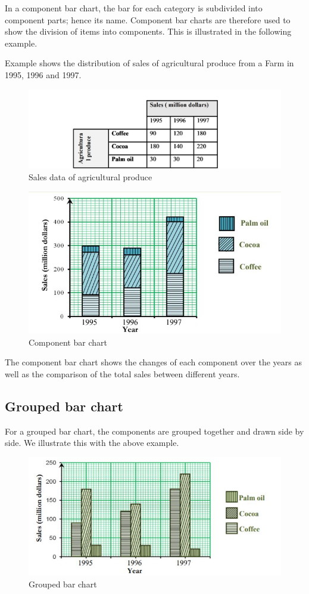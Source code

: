 \documentclass[
]{book}
\begin{document}
In a component bar chart, the bar for each category is subdivided into component parts; hence its name. Component bar charts are therefore used to show the division of items into components. This is illustrated in the following example.

Example shows the distribution of sales of agricultural produce from a Farm in 1995, 1996 and 1997.

\begin{figure}

{\centering \includegraphics[width=0.5\linewidth]{images/image14} 

}

\caption{Sales data of agricultural produce}\label{fig:componentdata}
\end{figure}

\begin{figure}

{\centering \includegraphics[width=0.5\linewidth]{images/image15} 

}

\caption{Component bar chart}\label{fig:componentbar}
\end{figure}

The component bar chart shows the changes of each component over the years as well as the comparison of the total sales between different years.

\hypertarget{grouped-bar-chart}{%
\subsection{Grouped bar chart}\label{grouped-bar-chart}}

For a grouped bar chart, the components are grouped together and drawn side by side. We illustrate this with the above example.

\begin{figure}

{\centering \includegraphics[width=0.7\linewidth]{images/image16} 

}

\caption{Grouped bar chart}\label{fig:groupbar}
\end{figure}
\end{document}
